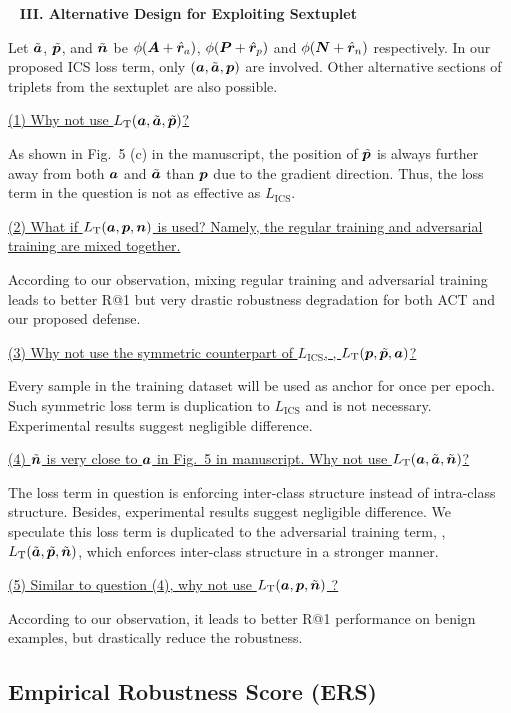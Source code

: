 ~\newline
\noindent\textbf{III. Alternative Design for Exploiting Sextuplet}

Let $\tilde{{\bm{a}}}$, $\tilde{{\bm{p}}}$, and $\tilde{{\bm{n}}}$ be $\phi({\bm{A}}+\hat{{\bm{r}}}_a)$,
$\phi({\bm{P}}+\hat{{\bm{r}}}_p)$ and $\phi({\bm{N}}+\hat{{\bm{r}}}_n)$ respectively.
%
In our proposed ICS loss term, only $({\bm{a}}, \tilde{{\bm{a}}}, {\bm{p}})$ are involved.
%
Other alternative sections of triplets from the sextuplet are also
possible.

\ul{(1) Why not use $L_\text{T}({\bm{a}}, \tilde{{\bm{a}}}, \tilde{{\bm{p}}})$? }

As shown in Fig.~5 (c) in the manuscript, the position of $\tilde{{\bm{p}}}$ is
always further away from both ${\bm{a}}$ and $\tilde{{\bm{a}}}$ than ${\bm{p}}$ due to
the gradient direction.
%
Thus, the loss term in the question is not as effective as $L_\text{ICS}$.

\ul{(2) What if $L_\text{T}({\bm{a}}, {\bm{p}}, {\bm{n}})$ is used? Namely, the regular training
and adversarial training are mixed together.}

According to our observation, mixing regular training and adversarial training
leads to better R@1 but very drastic robustness degradation for both ACT and
our proposed defense.

\ul{(3) Why not use the symmetric counterpart of $L_\text{ICS}$, \ie,
		$L_\text{T}({\bm{p}}, \tilde{{\bm{p}}}, {\bm{a}})$?}

Every sample in the training dataset will be used as anchor for once per
epoch.
%
Such symmetric loss term is duplication to $L_\text{ICS}$ and is
not necessary.
%
Experimental results suggest negligible difference.

\ul{(4) $\tilde{{\bm{n}}}$ is very close to ${\bm{a}}$ in Fig.~5 in manuscript.
Why not use $L_\text{T}({\bm{a}}, \tilde{{\bm{a}}}, \tilde{{\bm{n}}})$?}

The loss term in question is enforcing inter-class structure instead of
intra-class structure.
%
Besides, experimental results suggest negligible difference.
%
We speculate this loss term is duplicated to the adversarial training term,
\ie, $L_\text{T}(\tilde{{\bm{a}}}, \tilde{{\bm{p}}}, \tilde{{\bm{n}}})$, which enforces
inter-class structure in a stronger manner.

\ul{(5) Similar to question (4), why not use $L_\text{T}({\bm{a}}, {\bm{p}}, \tilde{{\bm{n}}})$ ?}

According to our observation, it leads to better R@1 performance on benign
examples, but drastically reduce the robustness.

\subsection{Empirical Robustness Score (ERS)}

